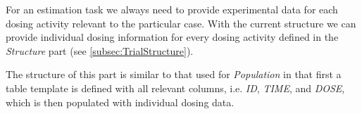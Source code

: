 For an estimation task we always need to provide experimental data for each dosing activity 
relevant to the particular case. With the current structure we can provide individual dosing 
information for every dosing activity defined in the \emph{Structure} part (see \ref{subsec:TrialStructure}).

The structure of this part is similar to that used for \emph{Population} in that first
a table template is defined with all relevant columns, i.e. \emph{ID}, \emph{TIME}, and \emph{DOSE},
which is then populated with individual dosing data. 


%
%
%



